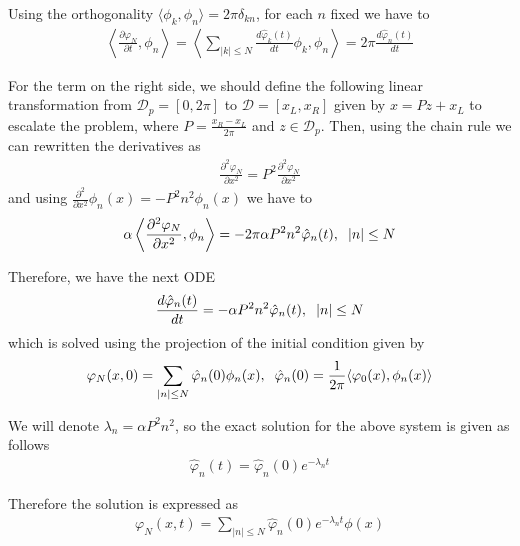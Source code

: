	Using the orthogonality $\langle \phi_k, \phi_n \rangle = 2 \pi \delta_{kn}$, for each $n$ fixed we have to
	\begin{align*}
		\left\langle \frac{\partial \varphi_N}{\partial t}, \phi_n  \right\rangle = \left\langle \displaystyle \sum_{ |k| \leq N} \frac{d \hat{\varphi}_k (t)}{dt} \phi_k, \phi_n  \right\rangle = 2 \pi \frac{d \hat{\varphi}_n (t)}{dt}
	\end{align*}
	
	\noindent For the term on the right side, we should define the following linear transformation from $\mathcal{D}_p = [0, 2 \pi]$ to $\mathcal{D} = [x_L, x_R]$ given by $x = P z + x_L$ to escalate the problem, where $P = \frac{x_R - x_L} {2 \pi}$ and $z \in \mathcal{D}_p$. Then, using the chain rule we can rewritten the derivatives as
	\begin{align*}
		\frac{\partial^2 \varphi_N}{\partial x^2} = P^2 \frac{\partial^2 \varphi_N}{\partial x^2} 
	\end{align*}
	and using $\frac{\partial^2}{\partial x^2} \phi_n (x) = -P^2 n^2 \phi_n (x)$ we have to  
	\begin{align*}
		\alpha \left\langle \frac{\partial^2 \varphi_N}{\partial x^2}, \phi_n \right\rangle = -2 \pi \alpha P^2 n^2 \hat{\varphi}_n (t), \hspace{2mm} |n| \leq N
	\end{align*}
	
	\noindent Therefore, we have the next ODE
	\begin{align*}
		\frac{d \hat{\varphi}_n (t)}{dt} = - \alpha P^2 n^2 \hat{\varphi}_n (t), \hspace{2mm} |n| \leq N 
	\end{align*}
	which is solved using the projection of the initial condition given by
	\begin{align*}
		\varphi_N (x, 0) = \displaystyle \sum_{|n| \leq N} \hat{\varphi}_n (0) \phi_n (x), \hspace{2mm} \hat{\varphi}_n (0) = \frac{1}{2 \pi} \langle \varphi_0 (x), \phi_n (x) \rangle   
	\end{align*}
	
	We will denote $\lambda_n = \alpha P^2 n^2$, so the exact solution for the above system is given as follows
	\begin{align*}
		\hat{\varphi}_n (t) = \hat{\varphi}_n (0) e^{-\lambda_n t}
	\end{align*} 
	
	Therefore the solution is expressed as
	\begin{align*}
		\varphi_N (x, t) = \displaystyle \sum_{ |n| \leq N} \hat{\varphi}_n (0) e^{-\lambda_n t} \phi (x) 
	\end{align*}
	
